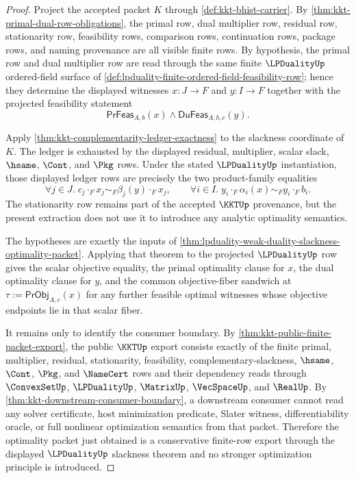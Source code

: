 \begin{proof}
Project the accepted packet $K$ through \autoref{def:kkt-bhist-carrier}. By \autoref{thm:kkt-primal-dual-row-obligations}, the primal row, dual multiplier row, residual row, stationarity row, feasibility rows, comparison rows, continuation rows, package rows, and naming provenance are all visible finite rows. By hypothesis, the primal row and dual multiplier row are read through the same finite $\LPDualityUp$ ordered-field surface of \autoref{def:lpduality-finite-ordered-field-feasibility-row}; hence they determine the displayed witnesses $x:J\to F$ and $y:I\to F$ together with the projected feasibility statement
$$
\mathsf{PrFeas}_{A,b}(x)\land\mathsf{DuFeas}_{A,b,c}(y).
$$

Apply \autoref{thm:kkt-complementarity-ledger-exactness} to the slackness coordinate of $K$. The ledger is exhausted by the displayed residual, multiplier, scalar slack, $\hsame$, $\Cont$, and $\Pkg$ rows. Under the stated $\LPDualityUp$ instantiation, those displayed ledger rows are precisely the two product-family equalities
$$
\forall j\in J.\; c_j\cdot_Fx_j\sim_F\beta_j(y)\cdot_Fx_j,
\qquad
\forall i\in I.\; y_i\cdot_F\alpha_i(x)\sim_Fy_i\cdot_Fb_i.
$$
The stationarity row remains part of the accepted $\KKTUp$ provenance, but the present extraction does not use it to introduce any analytic optimality semantics.

The hypotheses are exactly the inputs of \autoref{thm:lpduality-weak-duality-slackness-optimality-packet}. Applying that theorem to the projected $\LPDualityUp$ row gives the scalar objective equality, the primal optimality clause for $x$, the dual optimality clause for $y$, and the common objective-fiber sandwich at $\tau:=\mathsf{PrObj}_{A,c}(x)$ for any further feasible optimal witnesses whose objective endpoints lie in that scalar fiber.

It remains only to identify the consumer boundary. By \autoref{thm:kkt-public-finite-packet-export}, the public $\KKTUp$ export consists exactly of the finite primal, multiplier, residual, stationarity, feasibility, complementary-slackness, $\hsame$, $\Cont$, $\Pkg$, and $\NameCert$ rows and their dependency reads through $\ConvexSetUp$, $\LPDualityUp$, $\MatrixUp$, $\VecSpaceUp$, and $\RealUp$. By \autoref{thm:kkt-downstream-consumer-boundary}, a downstream consumer cannot read any solver certificate, host minimization predicate, Slater witness, differentiability oracle, or full nonlinear optimization semantics from that packet. Therefore the optimality packet just obtained is a conservative finite-row export through the displayed $\LPDualityUp$ slackness theorem and no stronger optimization principle is introduced.
\end{proof}
